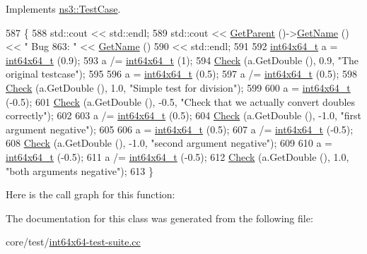 Implements \hyperlink{classns3_1_1TestCase_a8ff74680cf017ed42011e4be51917a24}{ns3\+::\+Test\+Case}.


\begin{DoxyCode}
587 \{
588   std::cout << std::endl;
589   std::cout << \hyperlink{classns3_1_1TestCase_af41db0462b844c9f81838d0e61ecd563}{GetParent} ()->\hyperlink{classns3_1_1TestCase_a28f7bb59669c24dae1c290fc17fc9b62}{GetName} () << \textcolor{stringliteral}{" Bug 863: "} << 
      \hyperlink{classns3_1_1TestCase_a28f7bb59669c24dae1c290fc17fc9b62}{GetName} ()
590             << std::endl;
591   
592   \hyperlink{classint64x64__t}{int64x64\_t} a = \hyperlink{classint64x64__t}{int64x64\_t} (0.9);
593   a /= \hyperlink{classint64x64__t}{int64x64\_t} (1);
594   \hyperlink{classns3_1_1int64x64_1_1test_1_1Int64x64Bug863TestCase_a46ed5833f706bb28868ccae327b9ea32}{Check} (a.GetDouble (), 0.9, \textcolor{stringliteral}{"The original testcase"});
595   
596   a = \hyperlink{classint64x64__t}{int64x64\_t} (0.5);
597   a /= \hyperlink{classint64x64__t}{int64x64\_t} (0.5);
598   \hyperlink{classns3_1_1int64x64_1_1test_1_1Int64x64Bug863TestCase_a46ed5833f706bb28868ccae327b9ea32}{Check} (a.GetDouble (), 1.0, \textcolor{stringliteral}{"Simple test for division"});
599   
600   a = \hyperlink{classint64x64__t}{int64x64\_t} (-0.5);
601   \hyperlink{classns3_1_1int64x64_1_1test_1_1Int64x64Bug863TestCase_a46ed5833f706bb28868ccae327b9ea32}{Check} (a.GetDouble (), -0.5, \textcolor{stringliteral}{"Check that we actually convert doubles correctly"});
602   
603   a /= \hyperlink{classint64x64__t}{int64x64\_t} (0.5);
604   \hyperlink{classns3_1_1int64x64_1_1test_1_1Int64x64Bug863TestCase_a46ed5833f706bb28868ccae327b9ea32}{Check} (a.GetDouble (), -1.0, \textcolor{stringliteral}{"first argument negative"});
605   
606   a = \hyperlink{classint64x64__t}{int64x64\_t} (0.5);
607   a /= \hyperlink{classint64x64__t}{int64x64\_t} (-0.5);
608   \hyperlink{classns3_1_1int64x64_1_1test_1_1Int64x64Bug863TestCase_a46ed5833f706bb28868ccae327b9ea32}{Check} (a.GetDouble (), -1.0, \textcolor{stringliteral}{"second argument negative"});
609   
610   a = \hyperlink{classint64x64__t}{int64x64\_t} (-0.5);
611   a /= \hyperlink{classint64x64__t}{int64x64\_t} (-0.5);
612   \hyperlink{classns3_1_1int64x64_1_1test_1_1Int64x64Bug863TestCase_a46ed5833f706bb28868ccae327b9ea32}{Check} (a.GetDouble (), 1.0, \textcolor{stringliteral}{"both arguments negative"});
613 \}
\end{DoxyCode}


Here is the call graph for this function\+:




The documentation for this class was generated from the following file\+:\begin{DoxyCompactItemize}
\item 
core/test/\hyperlink{int64x64-test-suite_8cc}{int64x64-\/test-\/suite.\+cc}\end{DoxyCompactItemize}
